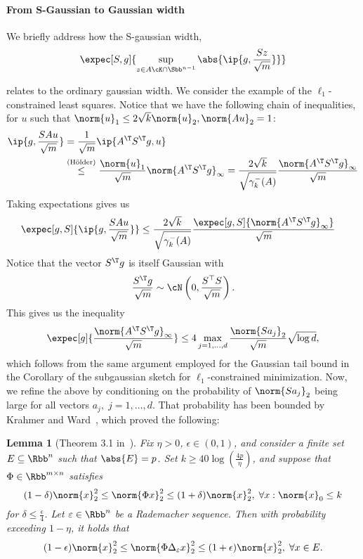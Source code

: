 \documentclass[a4paper]{article}
\newtheorem{lemma}{Lemma}
\begin{document}
\paragraph{From S-Gaussian to Gaussian width}
We briefly address how the S-gaussian width,
\[
	\expec[S, g]{\sup_{z \in A \cK \cap \Sbb^{n-1}}
		\abs{\ip{g, \frac{Sz}{\sqrt{m}}}}}
\]

relates to the ordinary gaussian width. We consider the example of the
$\ell_1$-constrained least squares. Notice that we have the following chain of
inequalities, for $u$ such that $\norm{u}_1 \leq 2 \sqrt{k} \norm{u}_2,
\norm{Au}_2 = 1$:
\begin{align*}
	\ip{g, \frac{S A u}{\sqrt{m}}} &= \frac{1}{\sqrt{m}}\ip{A^\T S^\T g, u} \\
		&\overset{(\text{H{\"o}lder})}{\leq} \frac{\norm{u}_1}{\sqrt{m}}
		 \norm{A^\T S^\T g}_{\infty} = \frac{2 \sqrt{k}}{\sqrt{\gamma_k^-(A)}}
		 \frac{\norm{A^\T S^\T g}_{\infty}}{\sqrt{m}}
\end{align*}
Taking expectations gives us
\begin{align*}
	\expec[g, S]{\ip{g, \frac{S A u}{\sqrt{m}}}} &\leq
	\frac{2 \sqrt{k}}{\sqrt{\gamma_k^-(A)}}
	\frac{\expec[g, S]{\norm{A^\T S^\T g}_{\infty}}}{\sqrt{m}}
\end{align*}
Notice that the vector $S^\T g$ is itself Gaussian with
\[
	\frac{S^\T g}{\sqrt{m}} \sim \cN\left(0, \frac{S^\top S}{\sqrt{m}} \right).
\]
This gives us the inequality
\[
	\expec[g]{\frac{\norm{A^\T S^\T g}_{\infty}}{\sqrt{m}}}
	\leq 4 \max_{j=1, \dots, d} \frac{\norm{S a_j}_2}{\sqrt{m}}
		\sqrt{\log d},
\]
which follows from the same argument employed for the Gaussian tail bound in
the Corollary of the subgaussian sketch for $\ell_1$-constrained minimization.
Now, we refine the above by conditioning on the probability of $\norm{S a_j}_2$
being large for all vectors $a_j, \; j = 1, \dots, d$.
That probability has been bounded by Krahmer and Ward~\cite{KraWard11}, which
proved the following:
\begin{lemma}[Theorem 3.1 in~\cite{KraWard11}]
	\label{lemma:JL_embedding_rademacher}
	Fix $\eta > 0$, $\epsilon \in (0, 1)$, and consider a finite set $E
	\subseteq \Rbb^n$ such that $\abs{E} = p$. Set $k \geq 40
	\log\left(\frac{4p}{\eta}\right)$, and suppose that $\Phi \in \Rbb^{m \times
	n}$ satisfies
	\[
		(1 - \delta) \norm{x}_2^2 \leq \norm{\Phi x}_2^2 \leq
		(1 + \delta) \norm{x}_2^2, \; \forall x : \norm{x}_0 \leq k
	\]
	for $\delta \leq \frac{\epsilon}{4}$. Let $\varepsilon \in \Rbb^n$ be a
		Rademacher sequence. Then with probability exceeding $1 - \eta$, it
		holds that
	\[
		(1 - \epsilon) \norm{x}_2^2 \leq
		\norm{\Phi \Delta_{\varepsilon} x}_2^2 \leq
		(1 + \epsilon) \norm{x}_2^2, \;
		\forall x \in E.
	\]
\end{lemma}
\end{document}
